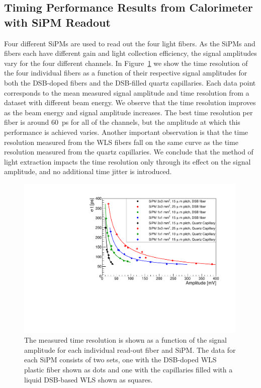 \subsection{Timing Performance Results from Calorimeter with SiPM Readout}
\label{sec:beamtiming}

Four different SiPMs are used to read out the four light fibers. As the SiPMs
and fibers each have different gain and light collection efficiency, the signal
amplitudes vary for the four different channels. In Figure~\ref{TimeResolution}
we show the time resolution of the four individual fibers as a function of their
respective signal amplitudes for both the DSB-doped fibers and the DSB-filled
quartz capillaries. Each data point corresponds to the mean measured 
signal amplitude and time resolution from a dataset 
with different beam energy. We observe that the time resolution improves as the
beam energy and signal amplitude increases. The best time resolution per fiber is around
$60$~ps for all of the channels, but the amplitude at which this performance is
achieved varies. Another important observation is that the time resolution
measured from the WLS fibers fall on the same curve as the time
resolution measured from the quartz capillaries. We conclude that the method of
light extraction impacts the time resolution only through its effect on the
signal amplitude, and no additional time jitter is introduced. 


\begin{figure}[!htb]
\centering
\includegraphics[width=0.99\textwidth]{figures/ShashlikTimeResolution.pdf}
\caption{\label{TimeResolution} The measured time resolution is shown as a
function of the signal amplitude for each individual read-out fiber and SiPM.
The data for each SiPM consists of two sets, one with the DSB-doped WLS plastic fiber
shown as dots and one with the capillaries filled with a liquid DSB-based WLS shown as
squares. }
\end{figure}


